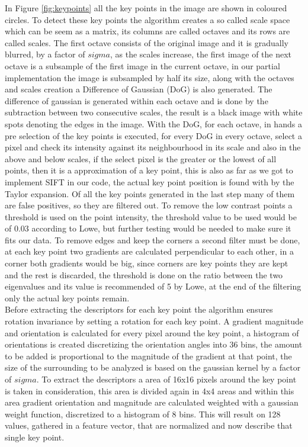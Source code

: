 \documentclass[12pt,a4paper]{article}
\begin{document}
In Figure \ref{fig:keypoints} all the key points in the image are shown in coloured circles. To detect these key points the algorithm creates a so called scale space which can be seem as a matrix, its columns are called octaves and its rows are called scales. The first octave consists of the original image and it is gradually blurred, by a factor of $sigma$, as the scales increase, the first image of the next octave is a subsample of the first image in the current octave, in our partial implementation the image is subsampled by half its size, along with the octaves and scales creation a Difference of Gaussian (DoG) is also generated. The difference of gaussian is generated within each octave and is done by the subtraction between two consecutive scales, the result is a black image with white spots denoting the edges in the image. With the DoG, for each octave, in hands a pre selection of the key points is executed, for every DoG in every octave, select a pixel and check its intensity against its neighbourhood in its scale and also in the above and below scales, if the select pixel is the greater or the lowest of all points, then it is a approximation of a key point, this is also as far as we got to implement SIFT in our code, the actual key point position is found with by the Taylor expansion. Of all the key points generated in the last step many of them are false positives, so they are filtered out. To remove the low contrast points a threshold is used on the point intensity, the threshold value to be used would be of 0.03 according to Lowe, but further testing would be needed to make sure it fits our data. To remove edges and keep the corners a second filter must be done, at each key point two gradients are calculated perpendicular to each other, in a corner both gradients would be big, since corners are key points they are kept and the rest is discarded, the threshold is done on the ratio between the two eigenvalues and its value is recommended of 5 by Lowe, at the end of the filtering only the actual key points remain. \\

Before extracting the descriptors for each key point the algorithm ensures rotation invariance by setting a rotation for each key point. A gradient magnitude and orientation is calculated for every pixel around the key point, a histogram of orientations is created discretizing the orientation angles into 36 bins, the amount to be added is proportional to the magnitude of the gradient at that point, the size of the surrounding to be analyzed is based on the gaussian kernel by a factor of $sigma$. To extract the descriptors a area of 16x16 pixels around the key point is taken in consideration, this area is divided again in 4x4 areas and within this area gradient orientation and magnitude are calculated weighted with a gaussian weight function, discretized to a histogram of 8 bins. This will result on 128 values, gathered in a feature vector, that are normalized and now describe that single key point. \\
\end{document}
